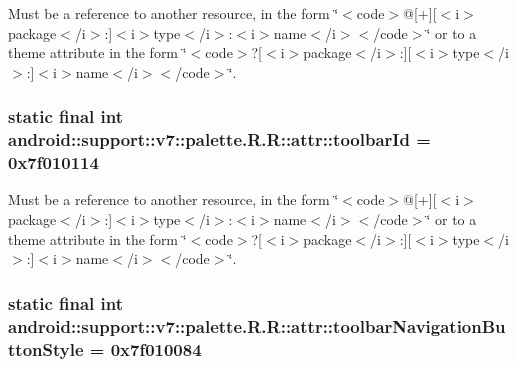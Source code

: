 Must be a reference to another resource, in the form \char`\"{}$<$code$>$@\mbox{[}+\mbox{]}\mbox{[}$<$i$>$package$<$/i$>$:\mbox{]}$<$i$>$type$<$/i$>$:$<$i$>$name$<$/i$>$$<$/code$>$\char`\"{} or to a theme attribute in the form \char`\"{}$<$code$>$?\mbox{[}$<$i$>$package$<$/i$>$:\mbox{]}\mbox{[}$<$i$>$type$<$/i$>$:\mbox{]}$<$i$>$name$<$/i$>$$<$/code$>$\char`\"{}. \hypertarget{classandroid_1_1support_1_1v7_1_1palette_1_1_r_1_1attr_4cb454c12a177ce59221a1ea575b9de4}{
\subsubsection[{toolbarId}]{\setlength{\rightskip}{0pt plus 5cm}static final int android::support::v7::palette.R.R::attr::toolbarId = 0x7f010114}}
\label{classandroid_1_1support_1_1v7_1_1palette_1_1_r_1_1attr_4cb454c12a177ce59221a1ea575b9de4}


Must be a reference to another resource, in the form \char`\"{}$<$code$>$@\mbox{[}+\mbox{]}\mbox{[}$<$i$>$package$<$/i$>$:\mbox{]}$<$i$>$type$<$/i$>$:$<$i$>$name$<$/i$>$$<$/code$>$\char`\"{} or to a theme attribute in the form \char`\"{}$<$code$>$?\mbox{[}$<$i$>$package$<$/i$>$:\mbox{]}\mbox{[}$<$i$>$type$<$/i$>$:\mbox{]}$<$i$>$name$<$/i$>$$<$/code$>$\char`\"{}. \hypertarget{classandroid_1_1support_1_1v7_1_1palette_1_1_r_1_1attr_931452f0bb25c2a75099c4aea5a15682}{
\subsubsection[{toolbarNavigationButtonStyle}]{\setlength{\rightskip}{0pt plus 5cm}static final int android::support::v7::palette.R.R::attr::toolbarNavigationButtonStyle = 0x7f010084}}
\label{classandroid_1_1support_1_1v7_1_1palette_1_1_r_1_1attr_931452f0bb25c2a75099c4aea5a15682}


